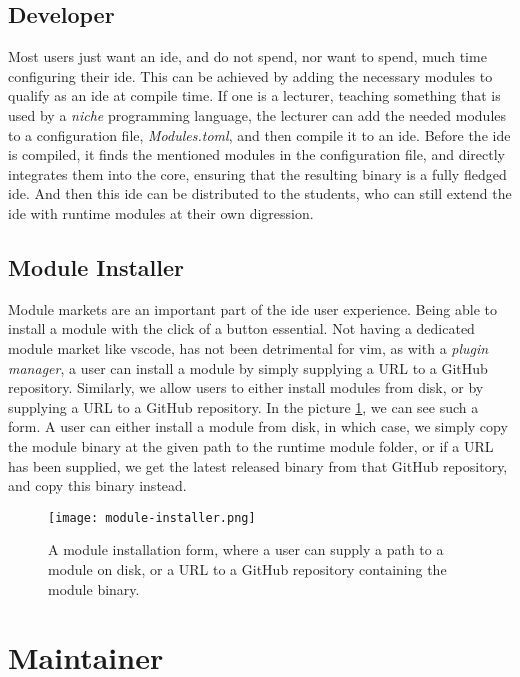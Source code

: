 \subsection{Developer}

Most users just want an \gls*{ide}, and do not spend, nor want to spend, much
time configuring their \gls*{ide}. This can be achieved by adding the necessary
modules to qualify as an \gls*{ide} at compile time. If one is a lecturer,
teaching something that is used by a \textit{niche} programming language, the
lecturer can add the needed modules to a configuration file,
\textit{Modules.toml}, and then compile it to an \gls*{ide}. Before the \gls*{ide}
is compiled, it finds the mentioned modules in the configuration file, and
directly integrates them into the core, ensuring that the resulting binary is a
fully fledged \gls*{ide}. And then this \gls*{ide} can be distributed to the
students, who can still extend the \gls*{ide} with runtime modules at their own
digression.

\subsection{Module Installer}

Module markets are an important part of the \gls*{ide} user experience. Being
able to install a module with the click of a button essential. Not having a
dedicated module market like \gls*{vscode}, has not been detrimental for
\gls*{vim}, as with a \textit{plugin manager}, a user can install a module by
simply supplying a URL to a GitHub repository. Similarly, we allow users to
either install modules from disk, or by supplying a URL to a GitHub repository.
In the picture \ref{pic:moduleInstaller}, we can see such a form. A user can
either install a module from disk, in which case, we simply copy the module
binary at the given path to the runtime module folder, or if a URL has been
supplied, we get the latest released binary from that GitHub repository, and
copy this binary instead.

\begin{figure}
  \centering
  \texttt{[image: module-installer.png]}
  \caption{
    A module installation form, where a user can supply a path to a module on
    disk, or a URL to a GitHub repository containing the module binary.
  }
  \label{pic:moduleInstaller}
\end{figure}


\section{Maintainer}

